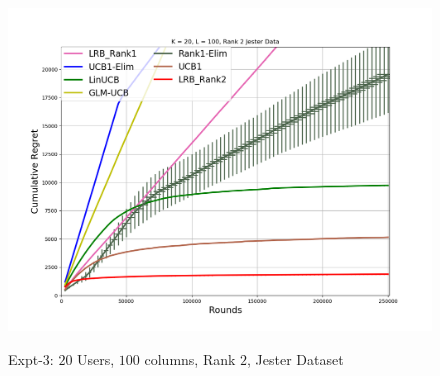 \begin{figure}
    {
    		\includegraphics[scale=0.13]{img/Figure_L4.png}
   }
 \caption{Expt-$3$: $20$ Users, $100$ columns, Rank $2$, Jester Dataset}
 \label{fig:6}
 \vspace{-2em}
\end{figure}

